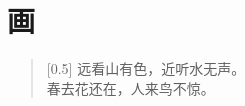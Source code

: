 \documentclass[12pt,UTF-8,openany]{ctexbook}
\begin{document}
\clearpage

\begin{center}
    
    
\end{center}


\hanzibox{}\hanzibox{}\hanzibox{}\hanzibox{}\hspace{1em}\hanzibox{}\hanzibox{}\hanzibox{}\hanzibox{}

\hanzibox{}\hanzibox{}\hanzibox{}\hanzibox{}\hspace{1em}\hanzibox{}\hanzibox{}\hanzibox{}\hanzibox{}

\hanzibox{}\hanzibox{}\hanzibox{}\hanzibox{}\hspace{1em}




\chapter{画}

\begin{large}
    
    \begin{verse}[0.5\linewidth]
        远看山有色，近听水无声。 \\
        春去花还在，人来鸟不惊。
    \end{verse}
    
\end{large}


\clearpage

\begin{center}
    
\end{center}


\hanzibox{}\hanzibox{}\hanzibox{}\hanzibox{}\hspace{1em}\hanzibox{}\hanzibox{}\hanzibox{}\hanzibox{}

\hanzibox{}\hanzibox{}\hanzibox{}\hanzibox{}\hspace{1em}\hanzibox{}\hanzibox{}\hanzibox{}\hanzibox{}

\hanzibox{}\hanzibox{}\hanzibox{}\hanzibox{}\hspace{1em}\hanzibox{}\hanzibox{}\hanzibox{}\hanzibox{}
\end{document}

